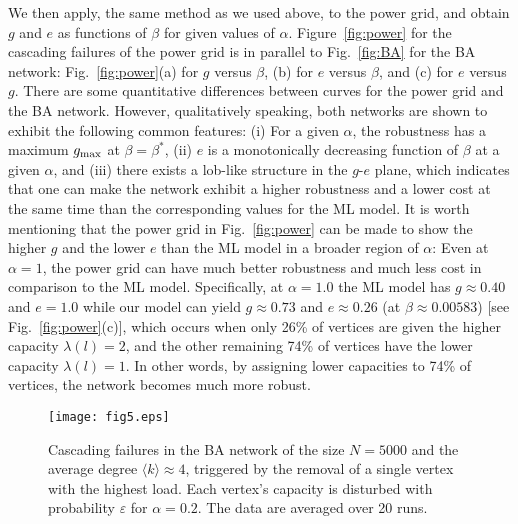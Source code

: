 \documentclass[doublecol]{epl2}
\begin{document}
We then apply, the same method as we used above, to the power grid,
and obtain $g$ and $e$ as functions of $\beta$ for given values of
$\alpha$. Figure~\ref{fig:power} for the cascading failures of the
power grid is in parallel to Fig.~\ref{fig:BA} for the BA network:
Fig.~\ref{fig:power}(a) for $g$ versus $\beta$, (b) for $e$ versus
$\beta$, and (c) for $e$ versus $g$. There are some quantitative
differences between curves for the power grid  and the BA network.
However, qualitatively speaking, both networks are shown to exhibit
the following common features: (i) For a given $\alpha$, the
robustness has a maximum $g_{\rm max}$ at $\beta=\beta^*$, (ii) $e$
is a monotonically decreasing  function of $\beta$  at a given
$\alpha$, and (iii) there exists a lob-like structure in the $g$-$e$
plane, which indicates that one can make the network exhibit a
higher robustness and a lower cost at the same time than the
corresponding values for the ML model. It is worth mentioning that
the power grid in Fig.~\ref{fig:power} can be made to show the
higher $g$ and the lower $e$ than the ML model in a broader region
of $\alpha$: Even at $\alpha = 1$, the power grid can have much
better robustness and much less cost in comparison to the ML model.
Specifically, at $\alpha = 1.0$ the ML model has $g \approx 0.40$
and $e = 1.0$ while our model can yield $g \approx 0.73$ and $ e
\approx 0.26$ (at $\beta \approx 0.00583$) [see
Fig.~\ref{fig:power}(c)], which occurs when only 26\% of vertices
are given the higher capacity $\lambda(l) = 2$, and the other
remaining 74\% of vertices have the lower capacity $\lambda(l) = 1$.
In other words, by assigning  lower capacities to 74\% of vertices,
the network becomes much more robust.

\begin{figure}
\begin{center}
{\texttt{[image: fig5.eps]}}
 \caption{
Cascading failures in the BA network of the size $N=5000$ and the
average degree $\langle k \rangle\approx{4}$, triggered by the
removal of a single vertex with the highest load. Each vertex's
capacity is disturbed with probability $\varepsilon$ for
$\alpha=0.2$. The data are averaged over 20 runs. }
\label{fig:noise}
\end{center}
\end{figure}
\end{document}
